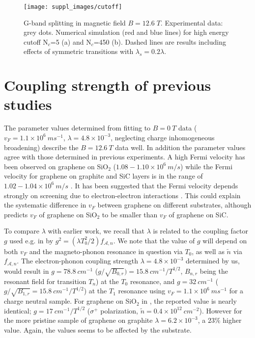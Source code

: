 \documentclass[pra,aps,superscriptaddress,preprint]{revtex4-1}
\begin{document}
\begin{figure}[h!]
   \texttt{[image: suppl\_images/cutoff]}
   \caption{\label{cutoff}G-band splitting in magnetic field $B=12.6 \; T$. Experimental data: grey dots. Numerical simulation (red and blue lines) for high energy cutoff N$_c$=5 (a) and N$_c$=450 (b). Dashed lines are results including effects of symmetric transitions with $\lambda_s=0.2\lambda$.}
\end{figure}

\section{Coupling strength of previous studies}

The parameter values determined from fitting to $B=0\: T$ data ($v_F=1.1\times 10^6\: ms^{-1}$, $\lambda=4.8\times 10^{-3}$, neglecting charge inhomogeneous broadening) describe the $B=12.6\: T$ data well. In addition the parameter values agree with those determined in previous experiments. A high Fermi velocity has been observed on graphene on SiO$_2$ ($1.08-1.10\times 10^6\: m/s$) \cite{PhysRevLett.110.227402,kossacki2012circular} while the Fermi velocity for graphene on graphite and SiC layers is in the range  of $1.02-1.04\times 10^6\: m/s$ \cite{faugeras2009tuning,kuhne2012polarization}. It has been suggested that the Fermi velocity depends strongly on screening due to electron-electron interactions \cite{hwang2012fermi}. This could explain the systematic difference in $v_F$ between graphene on different substrates, although \cite{hwang2012fermi} predicts $v_F$ of graphene on SiO$_2$ to be smaller than $v_F$ of graphene on SiC.

To compare $\lambda$ with earlier work, we recall that $\lambda$ is related to the coupling factor $g$ used e.g. in \cite{yan2010observation,PhysRevLett.110.227402} by $g^2=(\lambda T_0^2/2) f_{\mathcal{A},n}$.  We note that  the value of $g$ will depend on both $v_F$ and the magneto-phonon resonance in question via $T_0$, as well as $\widetilde{n}$ via $f_{\mathcal{A},n}$.
The electron-phonon coupling strength $\lambda=4.8\times 10^{-3}$ determined by us,
would result in $g=78.8\: cm^{-1}$  ($ g/\sqrt{B_{0,r}})=15.8 \:  cm^{-1}/T^{1/2}$, $B_{n,r}$ being the resonant field for transition $T_n$) at the $T_0$ resonance, and  $ g=32\: cm^{-1}$ ($ g/\sqrt{B_{1,r}}=15.8\: cm^{-1}/T^{1/2}$) at the $T_1$ resonance using $v_F=1.1\times 10^6\: ms^{-1}$ for a charge neutral sample. For graphene on SiO$_2$  in \cite{PhysRevLett.110.227402}, the reported value is nearly identical;  $ g=17\: cm^{-1}/T^{1/2}$ ($\sigma^+$ polarization, $\widetilde{n}=0.4\times 10^{12}\: cm^{-2}$). However for the more pristine sample of  graphene on graphite \cite{yan2010observation} $\lambda= 6.2 \times 10^{-3}$, a $23\%$ higher value. Again, the values seems to be affected by the substrate.
\end{document}
